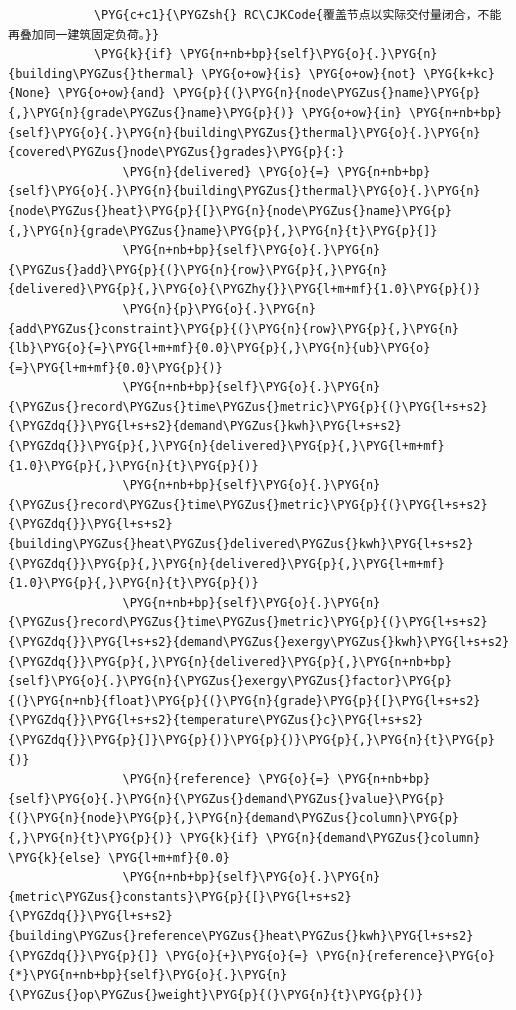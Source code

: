\begin{Verbatim}
            \PYG{c+c1}{\PYGZsh{} RC\CJKCode{覆盖节点以实际交付量闭合，不能再叠加同一建筑固定负荷。}}
            \PYG{k}{if} \PYG{n+nb+bp}{self}\PYG{o}{.}\PYG{n}{building\PYGZus{}thermal} \PYG{o+ow}{is} \PYG{o+ow}{not} \PYG{k+kc}{None} \PYG{o+ow}{and} \PYG{p}{(}\PYG{n}{node\PYGZus{}name}\PYG{p}{,}\PYG{n}{grade\PYGZus{}name}\PYG{p}{)} \PYG{o+ow}{in} \PYG{n+nb+bp}{self}\PYG{o}{.}\PYG{n}{building\PYGZus{}thermal}\PYG{o}{.}\PYG{n}{covered\PYGZus{}node\PYGZus{}grades}\PYG{p}{:}
                \PYG{n}{delivered} \PYG{o}{=} \PYG{n+nb+bp}{self}\PYG{o}{.}\PYG{n}{building\PYGZus{}thermal}\PYG{o}{.}\PYG{n}{node\PYGZus{}heat}\PYG{p}{[}\PYG{n}{node\PYGZus{}name}\PYG{p}{,}\PYG{n}{grade\PYGZus{}name}\PYG{p}{,}\PYG{n}{t}\PYG{p}{]}
                \PYG{n+nb+bp}{self}\PYG{o}{.}\PYG{n}{\PYGZus{}add}\PYG{p}{(}\PYG{n}{row}\PYG{p}{,}\PYG{n}{delivered}\PYG{p}{,}\PYG{o}{\PYGZhy{}}\PYG{l+m+mf}{1.0}\PYG{p}{)}
                \PYG{n}{p}\PYG{o}{.}\PYG{n}{add\PYGZus{}constraint}\PYG{p}{(}\PYG{n}{row}\PYG{p}{,}\PYG{n}{lb}\PYG{o}{=}\PYG{l+m+mf}{0.0}\PYG{p}{,}\PYG{n}{ub}\PYG{o}{=}\PYG{l+m+mf}{0.0}\PYG{p}{)}
                \PYG{n+nb+bp}{self}\PYG{o}{.}\PYG{n}{\PYGZus{}record\PYGZus{}time\PYGZus{}metric}\PYG{p}{(}\PYG{l+s+s2}{\PYGZdq{}}\PYG{l+s+s2}{demand\PYGZus{}kwh}\PYG{l+s+s2}{\PYGZdq{}}\PYG{p}{,}\PYG{n}{delivered}\PYG{p}{,}\PYG{l+m+mf}{1.0}\PYG{p}{,}\PYG{n}{t}\PYG{p}{)}
                \PYG{n+nb+bp}{self}\PYG{o}{.}\PYG{n}{\PYGZus{}record\PYGZus{}time\PYGZus{}metric}\PYG{p}{(}\PYG{l+s+s2}{\PYGZdq{}}\PYG{l+s+s2}{building\PYGZus{}heat\PYGZus{}delivered\PYGZus{}kwh}\PYG{l+s+s2}{\PYGZdq{}}\PYG{p}{,}\PYG{n}{delivered}\PYG{p}{,}\PYG{l+m+mf}{1.0}\PYG{p}{,}\PYG{n}{t}\PYG{p}{)}
                \PYG{n+nb+bp}{self}\PYG{o}{.}\PYG{n}{\PYGZus{}record\PYGZus{}time\PYGZus{}metric}\PYG{p}{(}\PYG{l+s+s2}{\PYGZdq{}}\PYG{l+s+s2}{demand\PYGZus{}exergy\PYGZus{}kwh}\PYG{l+s+s2}{\PYGZdq{}}\PYG{p}{,}\PYG{n}{delivered}\PYG{p}{,}\PYG{n+nb+bp}{self}\PYG{o}{.}\PYG{n}{\PYGZus{}exergy\PYGZus{}factor}\PYG{p}{(}\PYG{n+nb}{float}\PYG{p}{(}\PYG{n}{grade}\PYG{p}{[}\PYG{l+s+s2}{\PYGZdq{}}\PYG{l+s+s2}{temperature\PYGZus{}c}\PYG{l+s+s2}{\PYGZdq{}}\PYG{p}{]}\PYG{p}{)}\PYG{p}{)}\PYG{p}{,}\PYG{n}{t}\PYG{p}{)}
                \PYG{n}{reference} \PYG{o}{=} \PYG{n+nb+bp}{self}\PYG{o}{.}\PYG{n}{\PYGZus{}demand\PYGZus{}value}\PYG{p}{(}\PYG{n}{node}\PYG{p}{,}\PYG{n}{demand\PYGZus{}column}\PYG{p}{,}\PYG{n}{t}\PYG{p}{)} \PYG{k}{if} \PYG{n}{demand\PYGZus{}column} \PYG{k}{else} \PYG{l+m+mf}{0.0}
                \PYG{n+nb+bp}{self}\PYG{o}{.}\PYG{n}{metric\PYGZus{}constants}\PYG{p}{[}\PYG{l+s+s2}{\PYGZdq{}}\PYG{l+s+s2}{building\PYGZus{}reference\PYGZus{}heat\PYGZus{}kwh}\PYG{l+s+s2}{\PYGZdq{}}\PYG{p}{]} \PYG{o}{+}\PYG{o}{=} \PYG{n}{reference}\PYG{o}{*}\PYG{n+nb+bp}{self}\PYG{o}{.}\PYG{n}{\PYGZus{}op\PYGZus{}weight}\PYG{p}{(}\PYG{n}{t}\PYG{p}{)}

\end{Verbatim}
